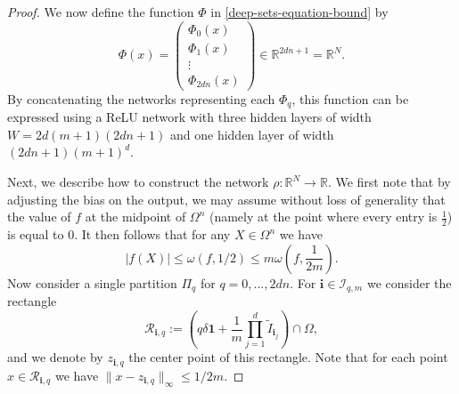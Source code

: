 \documentclass[twoside,11pt]{article}
\begin{document}
\begin{proof}
    We now define the function $\Phi$ in \eqref{deep-sets-equation-bound} by 
    \begin{equation}
        \Phi(x) = \begin{pmatrix}
            \Phi_{0}(x)\\
            \Phi_{1}(x)\\
            \vdots\\
            \Phi_{2dn}(x)
        \end{pmatrix}\in \mathbb{R}^{2dn+1} = \mathbb{R}^N.
    \end{equation}
    By concatenating the networks representing each $\Phi_q$, this function can be expressed using a ReLU network with three hidden layers of width $W = 2d(m+1)(2dn + 1)$ and one hidden layer of width $(2dn + 1)(m+1)^d$.

    Next, we describe how to construct the network $\rho:\mathbb{R}^N\rightarrow\mathbb{R}$. We first note that by adjusting the bias on the output, we may assume without loss of generality that the value of $f$ at the midpoint of $\Omega^n$ (namely at the point where every entry is $\frac{1}{2}$) is equal to $0$. It then follows that for any $X\in \Omega^n$ we have 
    \begin{equation}\label{a-priori-bound-on-f}
        |f(X)| \leq \omega(f,1/2)\leq m\omega\left(f,\frac{1}{2m}\right).\end{equation}
        Now consider a single partition $\Pi_q$ for $q=0,...,2dn$. For $\textbf{i}\in \mathcal{I}_{q,m}$ we consider the rectangle
        \begin{equation}\label{eqn:36}
            \mathcal{R}_{\textbf{i},q} := \left(q\delta\textbf{1} + \frac{1}{m}\prod_{j=1}^d \tilde{I}_{\textbf{i}_j}\right)\cap \Omega,
        \end{equation}
        and we denote by $z_{\textbf{i},q}$ the center point of this rectangle. Note that for each point $x\in \mathcal{R}_{\textbf{i},q}$ we have $\|x - z_{\textbf{i},q}\|_\infty \leq 1/2m$.
        

\end{proof}
\end{document}
